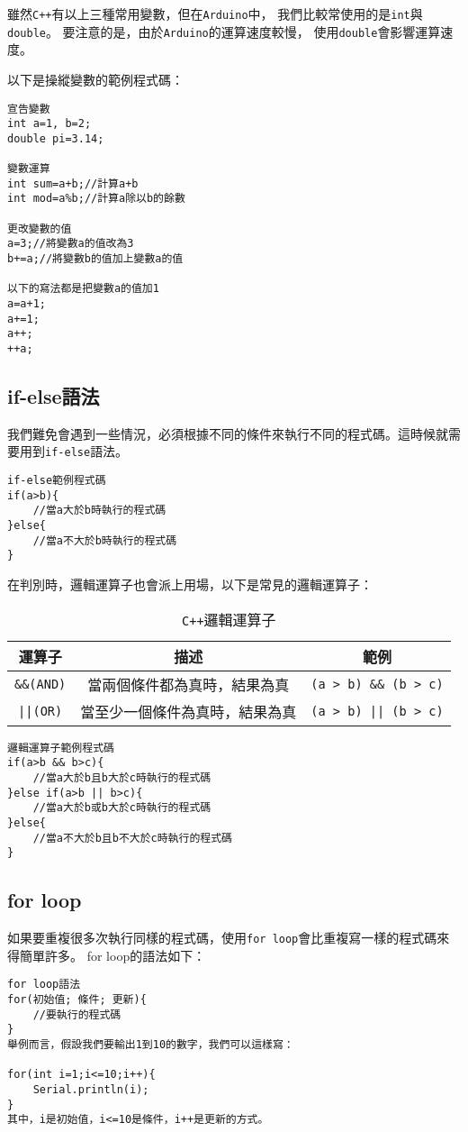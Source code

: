 \documentclass[12pt,a4paper]{article}
\begin{document}
雖然\texttt{C++}有以上三種常用變數，但在\texttt{Arduino}中，
我們比較常使用的是\texttt{int}與\texttt{double}。
要注意的是，由於\texttt{Arduino}的運算速度較慢，
使用\texttt{double}會影響運算速度。

以下是操縱變數的範例程式碼：

\begin{lstlisting}
宣告變數
int a=1, b=2;
double pi=3.14;

變數運算
int sum=a+b;//計算a+b
int mod=a%b;//計算a除以b的餘數

更改變數的值
a=3;//將變數a的值改為3
b+=a;//將變數b的值加上變數a的值

以下的寫法都是把變數a的值加1
a=a+1;
a+=1;
a++;
++a;
\end{lstlisting}
    
\subsection{if-else語法}
我們難免會遇到一些情況，必須根據不同的條件來執行不同的程式碼。這時候就需要用到\texttt{if-else}語法。


\begin{lstlisting}
if-else範例程式碼
if(a>b){
    //當a大於b時執行的程式碼
}else{
    //當a不大於b時執行的程式碼
}
\end{lstlisting}

在判別時，邏輯運算子也會派上用場，以下是常見的邏輯運算子：
\begin{table}[h!]
\centering
\begin{tabular}{|c|c|c|}
\hline
\textbf{運算子} & \textbf{描述} & \textbf{範例} \\ \hline
\texttt{\&\&(AND)}  & 當兩個條件都為真時，結果為真 & \texttt{(a > b) \&\& (b > c)} \\ \hline
\texttt{||(OR)}  & 當至少一個條件為真時，結果為真 & \texttt{(a > b) || (b > c)} \\ \hline
\end{tabular}
\caption{\texttt{C++}邏輯運算子}
\label{tab:logical_bitwise_operators}
\end{table}

\begin{lstlisting}
邏輯運算子範例程式碼
if(a>b && b>c){
    //當a大於b且b大於c時執行的程式碼
}else if(a>b || b>c){
    //當a大於b或b大於c時執行的程式碼
}else{
    //當a不大於b且b不大於c時執行的程式碼
}
\end{lstlisting}

\subsection{for loop}
如果要重複很多次執行同樣的程式碼，使用\texttt{for loop}會比重複寫一樣的程式碼來得簡單許多。
for loop的語法如下：
\begin{lstlisting}
for loop語法
for(初始值; 條件; 更新){
    //要執行的程式碼
}
舉例而言，假設我們要輸出1到10的數字，我們可以這樣寫：

for(int i=1;i<=10;i++){
    Serial.println(i);
}
其中，i是初始值，i<=10是條件，i++是更新的方式。
\end{lstlisting}
\end{document}
